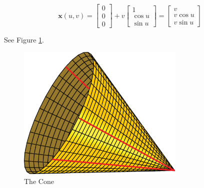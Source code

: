 \begin{example}
\begin{displaymath}
\mathbf x(u,v) =  \left[ \begin{array}{c} 0\\0\\0 \end{array} \right] + v\left[ \begin{array}{c} 1\\ \cos u \\ \sin u \end{array} \right] = \left[ \begin{array}{c} v\\v \cos u \\v \sin u \end{array} \right]
\end{displaymath}

See Figure \ref{fig:cone}.

\begin{figure}[htbp]
	\centering
       \includegraphics[width=8cm]{Images/Cone.eps}
   \caption{The Cone}
   \label{fig:cone}
\end{figure} 
\end{example}

